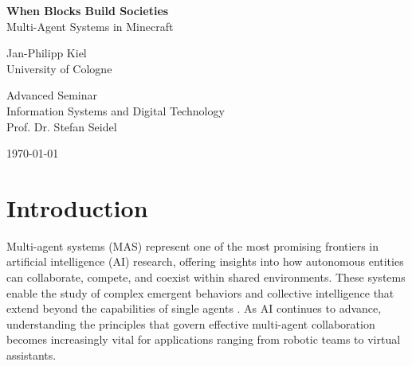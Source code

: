 \documentclass[a4paper, 12pt]{article}
\begin{document}

\begin{titlepage}
    \begin{center}
        \vspace*{\fill}
        \vspace*{-2cm}
        \large
        {\bfseries{When Blocks Build Societies}}\\
        Multi-Agent Systems in Minecraft\\

        \vspace{1cm}

        Jan-Philipp Kiel\\
        University of Cologne

        \vspace{1cm}

        Advanced Seminar\\
        Information Systems and Digital Technology\\
        Prof. Dr. Stefan Seidel

        \vspace{1cm}

        \today
        \vspace*{\fill}
    \end{center}
\end{titlepage}

\clearpage
\tableofcontents
\clearpage




\section{Introduction}

Multi-agent systems (MAS) represent one of the most promising frontiers in artificial intelligence (AI) research, offering insights into how autonomous entities can collaborate, compete, and coexist within shared environments. These systems enable the study of complex emergent behaviors and collective intelligence that extend beyond the capabilities of single agents \autocite{Leeuwen2021SelfOrganizingMS, shu2024effectivegenaimultiagentcollaboration}. As AI continues to advance, understanding the principles that govern effective multi-agent collaboration becomes increasingly vital for applications ranging from robotic teams to virtual assistants.
\end{document}
